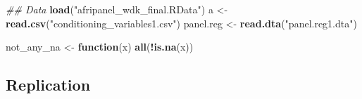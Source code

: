 \documentclass[]{article}
\newenvironment{Shaded}{\begin{snugshade}}{\end{snugshade}}
\newcommand{\CommentTok}[1]{\textcolor[rgb]{0.56,0.35,0.01}{\textit{#1}}}
\newcommand{\ControlFlowTok}[1]{\textcolor[rgb]{0.13,0.29,0.53}{\textbf{#1}}}
\newcommand{\KeywordTok}[1]{\textcolor[rgb]{0.13,0.29,0.53}{\textbf{#1}}}
\newcommand{\NormalTok}[1]{#1}
\newcommand{\OperatorTok}[1]{\textcolor[rgb]{0.81,0.36,0.00}{\textbf{#1}}}
\newcommand{\StringTok}[1]{\textcolor[rgb]{0.31,0.60,0.02}{#1}}
\begin{document}
\begin{Shaded}
\begin{Highlighting}[]
\CommentTok{## Data}
\KeywordTok{load}\NormalTok{(}\StringTok{"afripanel_wdk_final.RData"}\NormalTok{)}
\NormalTok{a <-}\StringTok{ }\KeywordTok{read.csv}\NormalTok{(}\StringTok{"conditioning_variables1.csv"}\NormalTok{)}
\NormalTok{panel.reg <-}\StringTok{ }\KeywordTok{read.dta}\NormalTok{(}\StringTok{"panel.reg1.dta"}\NormalTok{)}

\NormalTok{not_any_na <-}\StringTok{ }\ControlFlowTok{function}\NormalTok{(x) }\KeywordTok{all}\NormalTok{(}\OperatorTok{!}\KeywordTok{is.na}\NormalTok{(x))}
\end{Highlighting}
\end{Shaded}

\hypertarget{replication}{%
\subsection{Replication}\label{replication}}
\end{document}
